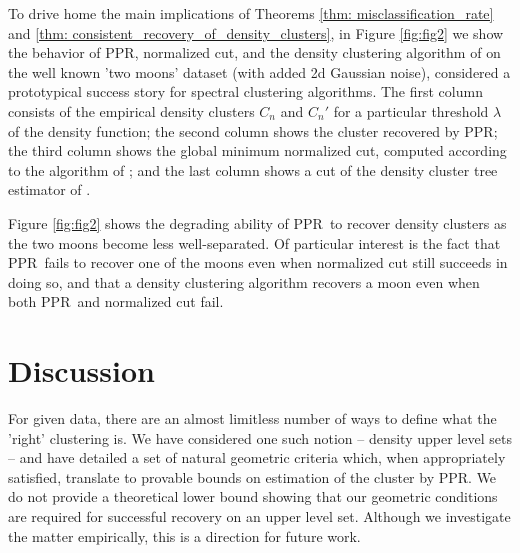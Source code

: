 \documentclass{article}
\newcommand{\1}{\mathbf{1}}
\newcommand{\ppr}{{\sc PPR}}
\newcommand{\pprspace}{{\sc PPR~}}
\theoremstyle{aldenthm}
\theoremstyle{aldenrmrk}
\begin{document}
To drive home the main implications of Theorems \ref{thm: misclassification_rate} and \ref{thm: consistent_recovery_of_density_clusters}, in Figure \ref{fig:fig2} we show the behavior of \ppr, normalized cut, and the density clustering algorithm of \citep{chaudhuri2010} on the well known 'two moons' dataset (with added 2d Gaussian noise), considered a prototypical success story for spectral clustering algorithms. The first column consists of the empirical density clusters $C_n$ and $C_n'$ for a particular threshold $\lambda$ of the density function; the second column shows the cluster recovered by \ppr; the third column shows the global minimum normalized cut, computed according to the algorithm of \cite{szlam2010}; and the last column shows a cut of the density cluster tree estimator of \citep{chaudhuri2010}.

Figure \ref{fig:fig2} shows the degrading ability of \pprspace to recover density clusters as the two moons become less well-separated. Of particular interest is the fact that \pprspace fails to recover one of the moons even when normalized cut still succeeds in doing so, and that a density clustering algorithm recovers a moon even when both \pprspace and normalized cut fail. 

\section{Discussion}
\label{sec: discussion}
For given data, there are an almost limitless number of ways to define what the 'right' clustering is. We have considered one such notion -- density upper level sets -- and have detailed a set of natural geometric criteria which, when appropriately satisfied, translate to provable bounds on estimation of the cluster by \ppr. We do not provide a theoretical lower bound showing that our geometric conditions are required for successful recovery on an upper level set. Although we investigate the matter empirically, this is a direction for future work.

\clearpage



\end{document}
